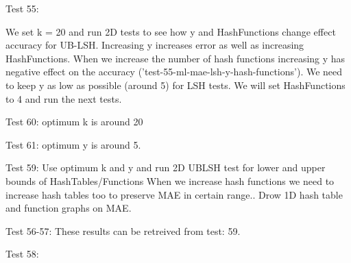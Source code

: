 Test 55:

We set k = 20 and run 2D tests to see how y and HashFunctions change effect accuracy for UB-LSH. Increasing y increases error as well as increasing HashFunctions.
When we increase the number of hash functions increasing y has negative effect on the accuracy
('test-55-ml-mae-lsh-y-hash-functions'). We need to keep y as low as possible (around 5) for LSH tests. We will set HashFunctions to 4 and run the next tests.

Test 60: optimum k is around 20

Test 61: optimum y is around 5.

Test 59: Use optimum k and y and run 2D UBLSH test for lower and upper bounds of HashTables/Functions
When we increase hash functions we need to increase hash tables too to preserve MAE in  certain range.. Drow 1D hash table and function graphs on MAE.

Test 56-57: These results can be retreived from test: 59.

Test 58: